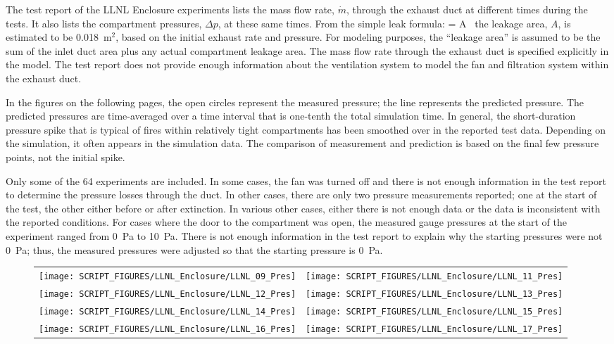 \clearpage

The test report of the LLNL Enclosure experiments lists the mass flow rate, $\dot{m}$, through the exhaust duct at different times during the tests. It also lists the compartment pressures, $\Delta p$, at these same times. From the simple leak formula:
\be
    = A \, 
\ee
the leakage area, $A$, is estimated to be 0.018~m$^2$, based on the initial exhaust rate and pressure. For modeling purposes, the ``leakage area'' is assumed to be the sum of the inlet duct area plus any actual compartment leakage area. The mass flow rate through the exhaust duct is specified explicitly in the model. The test report does not provide enough information about the ventilation system to model the fan and filtration system within the exhaust duct.

In the figures on the following pages, the open circles represent the measured pressure; the line represents the predicted pressure. The predicted pressures are time-averaged over a time interval that is one-tenth the total simulation time. In general, the short-duration pressure spike that is typical of fires within relatively tight compartments has been smoothed over in the reported test data. Depending on the simulation, it often appears in the simulation data. The comparison of measurement and prediction is based on the final few pressure points, not the initial spike.

Only some of the 64 experiments are included. In some cases, the fan was turned off and there is not enough information in the test report to determine the pressure losses through the duct. In other cases, there are only two pressure measurements reported; one at the start of the test, the other either before or after extinction. In various other cases, either there is not enough data or the data is inconsistent with the reported conditions. For cases where the door to the compartment was open, the measured gauge pressures at the start of the experiment ranged from 0~Pa to 10~Pa. There is not enough information in the test report to explain why the starting pressures were not 0~Pa; thus, the measured pressures were adjusted so that the starting pressure is 0~Pa.

\begin{figure}[p]
\begin{tabular*}{\textwidth}{l@{\extracolsep{\fill}}r}
\texttt{[image: SCRIPT\_FIGURES/LLNL\_Enclosure/LLNL\_09\_Pres]} &
\texttt{[image: SCRIPT\_FIGURES/LLNL\_Enclosure/LLNL\_11\_Pres]} \\
\texttt{[image: SCRIPT\_FIGURES/LLNL\_Enclosure/LLNL\_12\_Pres]} &
\texttt{[image: SCRIPT\_FIGURES/LLNL\_Enclosure/LLNL\_13\_Pres]} \\
\texttt{[image: SCRIPT\_FIGURES/LLNL\_Enclosure/LLNL\_14\_Pres]} &
\texttt{[image: SCRIPT\_FIGURES/LLNL\_Enclosure/LLNL\_15\_Pres]} \\
\texttt{[image: SCRIPT\_FIGURES/LLNL\_Enclosure/LLNL\_16\_Pres]} &
\texttt{[image: SCRIPT\_FIGURES/LLNL\_Enclosure/LLNL\_17\_Pres]}
\end{tabular*}
\label{LLNL_Enclosure_Pres_2}
\end{figure}


